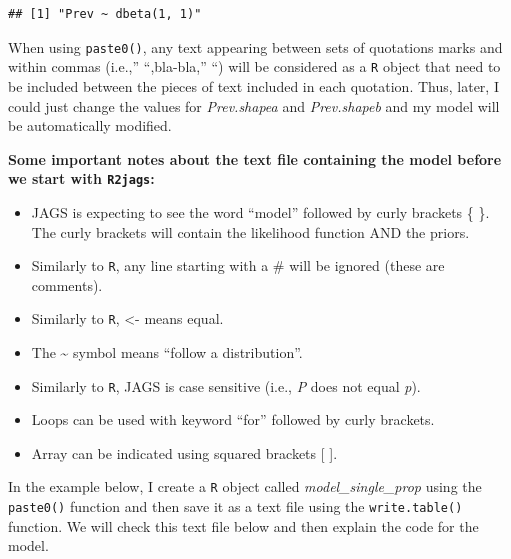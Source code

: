 \documentclass[
]{book}
\begin{document}
\begin{verbatim}
## [1] "Prev ~ dbeta(1, 1)"
\end{verbatim}

When using \texttt{paste0()}, any text appearing between sets of
quotations marks and within commas (i.e.,'' ``,bla-bla,'' ``) will be
considered as a \texttt{R} object that need to be included between the
pieces of text included in each quotation. Thus, later, I could just
change the values for \emph{Prev.shapea} and \emph{Prev.shapeb} and my
model will be automatically modified.

\textbf{Some important notes about the text file containing the model
before we start with \texttt{R2jags}:}

\begin{itemize}
\item
  JAGS is expecting to see the word ``model'' followed by curly brackets
  \{ \}. The curly brackets will contain the likelihood function AND the
  priors.
\item
  Similarly to \texttt{R}, any line starting with a \# will be ignored
  (these are comments).
\item
  Similarly to \texttt{R}, \textless- means equal.
\item
  The \textasciitilde{} symbol means ``follow a distribution''.
\item
  Similarly to \texttt{R}, JAGS is case sensitive (i.e., \emph{P} does
  not equal \emph{p}).
\item
  Loops can be used with keyword ``for'' followed by curly brackets.
\item
  Array can be indicated using squared brackets {[} {]}.
\end{itemize}

In the example below, I create a \texttt{R} object called
\emph{model\_single\_prop} using the \texttt{paste0()} function and then
save it as a text file using the \texttt{write.table()} function. We
will check this text file below and then explain the code for the model.
\end{document}
